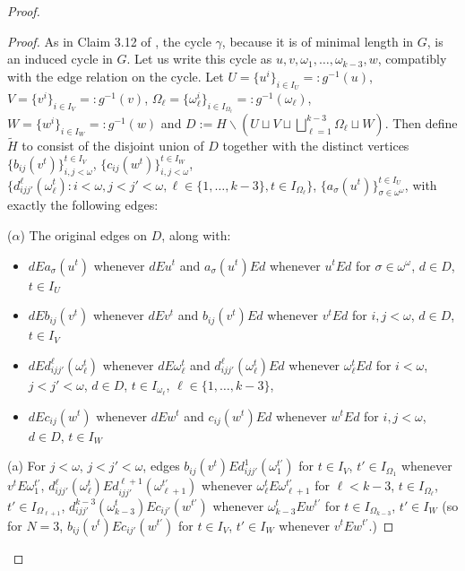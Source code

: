 \documentclass{amsart}
\theoremstyle{definition}
\theoremstyle{remark}
\numberwithin{equation}{section}
\begin{document}
\begin{tcolorbox}
\begin{proof}
\begin{proof}
    As in Claim 3.12 of \cite{ApproxOrder}, the cycle $\gamma$, because it is of minimal length in $G$, is an induced cycle in $G$. Let us write this cycle as $u, v, \omega_{1}, \ldots, \omega_{k-3}, w $, compatibly with the edge relation on the cycle. Let $U=\{u^{i}\}_{i \in I_{U}} =: g^{-1}(u)$, $V=\{v^{i}\}_{i \in I_{V}} =: g^{-1}(v)$, $\Omega_{\ell} = \{\omega_{\ell}^{i}\}_{i \in I_{\Omega_{\ell}}} =: g^{-1}(\omega_{\ell}) $, $W=\{w^{i}\}_{i \in I_{W}} =: g^{-1}(w)$ and $D := H \backslash ( U \sqcup V \sqcup \bigsqcup^{k-3}_{\ell =1} \Omega_{\ell} \sqcup W ) $. Then define $\widetilde{H}$ to consist of the disjoint union of $D$ together with the distinct vertices $\{b_{ij}(v^{t})\}^{t \in I_{V}}_{i, j < \omega}$, $\{c_{ij}(w^{t})\}^{t \in I_{W}}_{i, j < \omega}$, $\{d^{\ell}_{ijj'}(\omega^{t}_{\ell}): i<\omega, j<j' < \omega, \ell\in \{1, \ldots, k-3\}, t \in I_{\Omega_{\ell}}\}$, $\{a_{\sigma}(u^{t})\}^{t \in I_{U}}_{\sigma \in \omega^{\omega}}$, with exactly the following edges:


\:


($\alpha$) The original edges on $D$, along with:
\begin{itemize}
    \item $d E a_{\sigma}(u^{t})$ whenever $d E u^{t}$ and $ a_{\sigma}(u^{t}) E d$ whenever $ u^{t} E d$ for $\sigma \in \omega^{\omega}$, $d \in D$, $t \in I_{U}$
    \item $d E b_{ij}(v^{t})$ whenever $d E v^{t}$ and $ b_{ij}(v^{t}) E d$ whenever $v^{t} E d$ for $i, j < \omega$, $d \in D$, $t \in I_{V}$

    \item $d E d^{\ell}_{ijj'}(\omega_{\ell}^{t})$ whenever $d E \omega_{\ell}^{t}$ and $ d^{\ell}_{ijj'}(\omega_{\ell}^{t}) E d$ whenever $\omega_{\ell}^{t} E d$ for $i < \omega$, $j< j' < \omega$, $d \in D$, $t \in I_{\omega_{\ell}}$, $\ell \in \{1, \ldots, k-3\} $,

    \item $d E c_{ij}(w^{t})$ whenever $d E w^{t}$ and $ c_{ij}(w^{t}) E d$ whenever $w^{t} E d$ for $i, j < \omega$, $d \in D$, $t \in I_{W}$
\end{itemize}



    (a) For $j < \omega$, $j < j' < \omega$, edges $b_{ij}(v^{t}) E d^{1}_{ijj'}(\omega^{t'}_{1})$ for $t \in I_{V}$, $t' \in I_{\Omega_{1}}$ whenever $v^{t} E \omega^{t'}_{1}$, $d^{\ell}_{ijj'}(\omega^{t}_{\ell})Ed_{ijj'}^{\ell+1}(\omega^{t'}_{\ell+1})$ whenever $\omega^{t}_{\ell}E\omega^{t'}_{\ell+1}$ for $ \ell < k -3$,  $t \in I_{\Omega_{\ell}}$, $t' \in I_{\Omega_{\ell+1}}$, $d^{k-3}_{ijj'}(\omega^{t}_{k-3}) E c_{ij'}(w^{t'})$ whenever $\omega^{t}_{k-3}Ew^{t'}$ for $t \in I_{\Omega_{k-3}}$, $t' \in I_{W}$ (so for $N = 3$, $b_{ij}(v^{t}) E c_{ij'}(w^{t'})$ for $t \in I_{V}$, $t' \in I_{W}$ whenever $v^{t}Ew^{t'}$.)
    

\end{proof}
\end{proof}
\end{tcolorbox}
\end{document}
